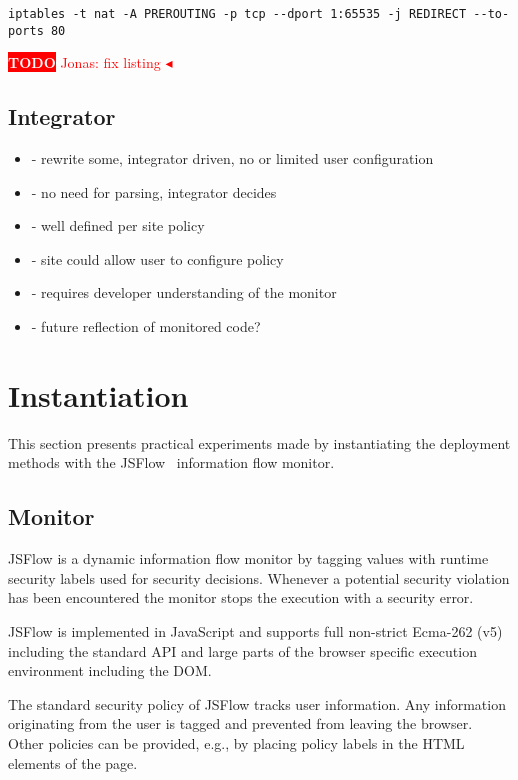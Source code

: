 \documentclass{llncs}
\newcommand{\todo}[1]{\colorbox{red}{\textcolor{white}{\sffamily\bfseries\scriptsize TODO}} \textcolor{red}{#1} \textcolor{red}{$\blacktriangleleft$}}
\begin{document}
\begin{lstlisting}[label=lst:iptables, caption=Example of redirecting ports using iptables]
iptables -t nat -A PREROUTING -p tcp --dport 1:65535 -j REDIRECT --to-ports 80
\end{lstlisting}
\todo{Jonas: fix listing}

\subsection{Integrator}

\begin{itemize}
\item- rewrite some, integrator driven, no or limited user configuration
\item- no need for parsing, integrator decides
\item- well defined per site policy
\item- site could allow user to configure policy
\item- requires developer understanding of the monitor
\item- future reflection of monitored code?
\end{itemize}


\section{Instantiation}
\label{sec:case}

This section presents practical experiments made by instantiating the deployment
methods with the JSFlow~\cite{Hedin:Sabelfeld:CSF12,JSFlow} information flow monitor. 

\subsection{Monitor}

JSFlow is a dynamic information flow monitor by tagging values with runtime
security labels used for security decisions. Whenever a potential security
violation has been encountered the monitor stops the execution with a security
error. 

JSFlow is implemented in JavaScript and supports full non-strict Ecma-262 (v5)
including the standard API and large parts of the browser specific execution
environment including the DOM.

The standard security policy of JSFlow tracks user information.  Any
information originating from the user is tagged and prevented from leaving the
browser. Other policies can be provided, e.g., by placing policy labels in the
HTML elements of the page. 
\end{document}
